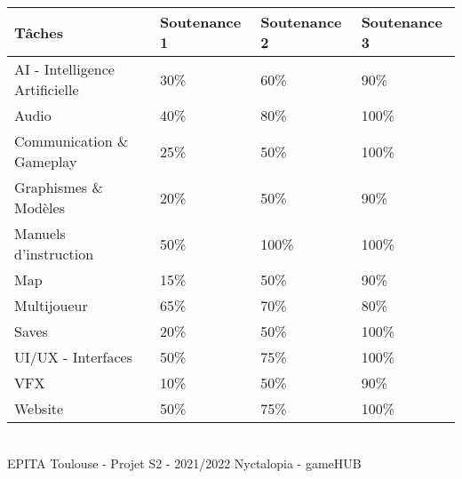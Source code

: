 \begin{center}
\begin{tabular}{|l|l|l|l|}
\hline
Tâches                         & Soutenance 1 & Soutenance 2 & Soutenance 3 \\ \hline
AI - Intelligence Artificielle & 30\%         & 60\%         & 90\%         \\ \hline
Audio                          & 40\%         & 80\%         & 100\%        \\ \hline
Communication \& Gameplay       & 25\%         & 50\%         & 100\%        \\ \hline
Graphismes \& Modèles          & 20\%         & 50\%         & 90\%         \\ \hline
Manuels d'instruction                       & 50\%         & 100\%        & 100\%        \\ \hline
Map                            & 15\%         & 50\%         & 90\%         \\ \hline
Multijoueur                    & 65\%         & 70\%         & 80\%         \\ \hline
Saves                          & 20\%         & 50\%         & 100\%        \\ \hline
UI/UX - Interfaces             & 50\%         & 75\%         & 100\%        \\ \hline
VFX                            & 10\%         & 50\%         & 90\%         \\ \hline
Website                        & 50\%         & 75\%         & 100\%        \\ \hline
\end{tabular}
\end{center}

\vfill
\noindent\makebox[\linewidth]{\rule{.8\paperwidth}{.6pt}}\\[0.2cm]
EPITA Toulouse - Projet S2 - 2021/2022 \hfill Nyctalopia - gameHUB
\noindent\makebox[\linewidth]{\rule{.8\paperwidth}{.6pt}}
\newpage